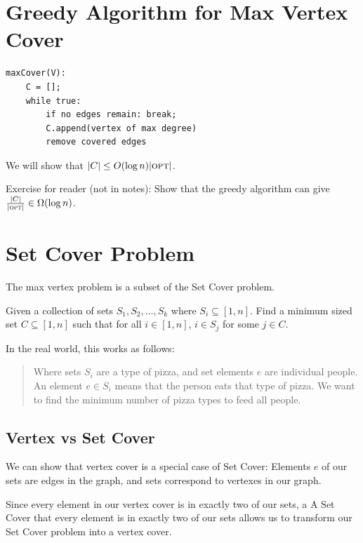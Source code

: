             \section{Greedy Algorithm for Max Vertex Cover} %
            \label{sec:greedy_algorithm_for_max_vertex_cover}
                \begin{lstlisting}
maxCover(V):
    C = [];
    while true:
        if no edges remain: break;
        C.append(vertex of max degree)
        remove covered edges
                \end{lstlisting}
                We will show that $|C| \le O(\log n) |\textsc{opt}|$.

                Exercise for reader (not in notes):
                Show that the greedy algorithm can give $\frac{|C|}{|\textsc{opt}|} \in \Omega (\log n)$.
            \section{Set Cover Problem} %
            \label{sec:set_cover_problem}
                The max vertex problem is a subset of the Set Cover problem.

                Given a collection of sets $S_1, S_2, \ldots, S_k$ where $S_i \subseteq [1, n]$.
                Find a minimum sized set $C \subseteq [1, n]$ such that for all $i \in [1, n]$, $i \in S_j$ for some $j \in C$.

                In the real world, this works as follows:
                \begin{quote}
                    Where sets $S_i$ are a type of pizza, and set elements $e$ are individual people.
                    An element $e \in S_i$ means that the person eats that type of pizza.
                    We want to find the minimum number of pizza types to feed all people.
                \end{quote}

                \subsection{Vertex vs Set Cover} %
                \label{sub:vertex_vs_set_cover}
                    We can show that vertex cover is a special case of Set Cover:
                    Elements $e$ of our sets are edges in the graph,
                    and sets correspond to vertexes in our graph.

                    Since every element in our vertex cover is in exactly two of our sets, a
                    A Set Cover that every element is in exactly two of our sets allows us to transform our Set Cover problem into a vertex cover.
